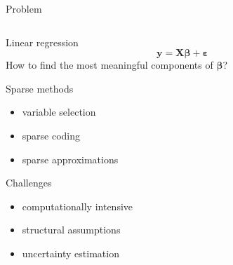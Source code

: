 \documentclass[9pt]{beamer}
\begin{document}
\begin{frame}{Problem}
  \begin{columns}
    \begin{column}{0.5\textwidth}
      \begin{block}{Linear regression}
        \begin{equation*}
          \mathbf{y} = \mathbf{X}\boldsymbol\beta + \boldsymbol\varepsilon
        \end{equation*}
        How to find the most meaningful components of \(\boldsymbol\beta\)?
      \end{block}
      \begin{block}{Sparse methods}
        \begin{itemize}
          \item variable selection
          \item sparse coding
          \item sparse approximations
        \end{itemize}
      \end{block}

      \begin{block}{Challenges}
        \begin{itemize}
          \item computationally intensive
          \item structural assumptions
          \item uncertainty estimation
        \end{itemize}
      \end{block}
    \end{column}


\end{columns}
\end{frame}
\end{document}
